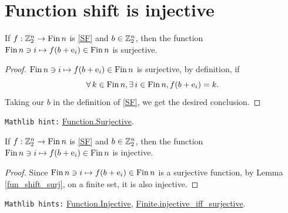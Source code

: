 \section{Function shift is injective}

\bigskip

\begin{lemma}
\label{fun_shift_surj}
\leanok
{}
If $f:\mathbb{Z}_2^n \to \mathrm{Fin}\, n$ is \eqref{SF} and $b\in\mathbb{Z}_2^n$,
then the function $\mathrm{Fin}\, n \ni i \mapsto f(b+{\rm e}_i) \in \mathrm{Fin}\, n$ is {\B surjective}.
\end{lemma}

\begin{proof}
\leanok
$\mathrm{Fin}\, n \ni i \mapsto f(b+{\rm e}_i) \in \mathrm{Fin}\, n$ is surjective, by definition, if
$$\forall\, k \in \mathrm{Fin}\, n, \exists\, i \in \mathrm{Fin}\, n, f(b+{\rm e}_i) = k.$$
Taking our $b$ in the definition of \eqref{SF}, we get the desired conclusion.
\end{proof}

\verb|Mathlib hint:| \href{https://leanprover-community.github.io/mathlib4_docs/Init/Data/Function.html#Function.Surjective}{Function.Surjective}.

\bigskip

\begin{lemma}
\label{fun_shift_inj}
\leanok
If $f:\mathbb{Z}_2^n \to \mathrm{Fin}\, n$ is \eqref{SF} and $b\in\mathbb{Z}_2^n$,
    then the function $\mathrm{Fin}\, n \ni i \mapsto f(b+{\rm e}_i) \in \mathrm{Fin}\, n$ is {\B injective}.
\end{lemma}

\begin{proof}
\leanok
Since $\mathrm{Fin}\, n \ni i \mapsto f(b+{\rm e}_i) \in \mathrm{Fin}\, n$ is a {\B surjective} function, by {\B Lemma} \ref{fun_shift_surj}, on a {\B finite} set, it is also {\B injective}.
\end{proof}

\verb|Mathlib hints:| \href{https://leanprover-community.github.io/mathlib4_docs/Init/Data/Function.html#Function.Injective}{Function.Injective}, \href{https://leanprover-community.github.io/mathlib4_docs/Mathlib/Data/Fintype/Card.html#Finite.injective_iff_surjective}{Finite.injective\_iff\_surjective}.

